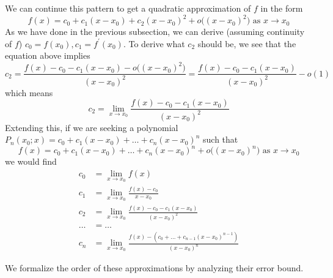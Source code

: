   We can continue this pattern to get a quadratic approximation of $f$ in the form
  \begin{equation}
    f(x) = c_0 + c_1 (x - x_0) + c_2 (x - x_0)^2 + o\big((x - x_0)^2 \big) \text{ as } x \rightarrow x_0
  \end{equation}
  As we have done in the previous subsection, we can derive (assuming continuity of $f$) $c_0 = f(x_0), c_1 = f^\prime (x_0)$. To derive what $c_2$ should be, we see that the equation above implies
  \begin{equation}
    c_2 = \frac{f(x) - c_0 - c_1 (x - x_0) - o\big((x - x_0)^2 \big)}{(x - x_0)^2} = \frac{f(x) - c_0 - c_1 (x - x_0)}{(x - x_0)^2} - o(1)
  \end{equation}
  which means
  \begin{equation}
    c_2 = \lim_{x \rightarrow x_0} \frac{f(x) - c_0 - c_1 (x - x_0)}{(x - x_0)^2}
  \end{equation}
  Extending this, if we are seeking a polynomial $P_n(x_0; x) = c_0 + c_1 (x - x_0) + \ldots + c_n (x - x_0)^n$ such that
  \begin{equation}
    f(x) = c_0 + c_1 (x - x_0) + \ldots + c_n (x - x_0)^n + o\big((x - x_0)^n\big) \text{ as } x \rightarrow x_0
  \end{equation}
  we would find 
  \begin{align}
      c_0 & = \lim_{x \rightarrow x_0} f(x) \\
      c_1 & = \lim_{x \rightarrow x_0} \frac{f(x) - c_0}{x - x_0} \\
      c_2 & = \lim_{x \rightarrow x_0} \frac{f(x) - c_0 - c_1 (x - x_0)}{(x - x_0)^2} \\
      \ldots & = \ldots \\
      c_n & = \lim_{x \rightarrow x_0} \frac{f(x) - (c_0 + \ldots + c_{n-1}(x - x_0)^{n-1})}{(x - x_0)^n}
  \end{align}

  We formalize the order of these approximations by analyzing their error bound. 

